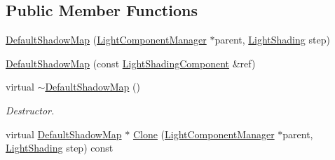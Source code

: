 \subsection*{Public Member Functions}
\begin{DoxyCompactItemize}
\item 
\mbox{\hyperlink{class_geometry_engine_1_1_light_utils_1_1_default_shadow_map_a8ef474f38d8d69a732971413dcfa453e}{Default\+Shadow\+Map}} (\mbox{\hyperlink{class_geometry_engine_1_1_light_utils_1_1_light_component_manager}{Light\+Component\+Manager}} $\ast$parent, \mbox{\hyperlink{namespace_geometry_engine_1_1_light_utils_a16eb370137c2fd151e6f8e1d07cd23e0}{Light\+Shading}} step)
\item 
\mbox{\hyperlink{class_geometry_engine_1_1_light_utils_1_1_default_shadow_map_ac71df76110848bdd359ddf1d6b385578}{Default\+Shadow\+Map}} (const \mbox{\hyperlink{class_geometry_engine_1_1_light_utils_1_1_light_shading_component}{Light\+Shading\+Component}} \&ref)
\item 
\mbox{\label{class_geometry_engine_1_1_light_utils_1_1_default_shadow_map_a7ca23c53dc0baf4503470c4e05922880}} 
virtual \mbox{\hyperlink{class_geometry_engine_1_1_light_utils_1_1_default_shadow_map_a7ca23c53dc0baf4503470c4e05922880}{$\sim$\+Default\+Shadow\+Map}} ()
\begin{DoxyCompactList}\small\item\em Destructor. \end{DoxyCompactList}\item 
virtual \mbox{\hyperlink{class_geometry_engine_1_1_light_utils_1_1_default_shadow_map}{Default\+Shadow\+Map}} $\ast$ \mbox{\hyperlink{class_geometry_engine_1_1_light_utils_1_1_default_shadow_map_aa13953acd90de9f9567cee0951c64684}{Clone}} (\mbox{\hyperlink{class_geometry_engine_1_1_light_utils_1_1_light_component_manager}{Light\+Component\+Manager}} $\ast$parent, \mbox{\hyperlink{namespace_geometry_engine_1_1_light_utils_a16eb370137c2fd151e6f8e1d07cd23e0}{Light\+Shading}} step) const
\end{DoxyCompactItemize}
